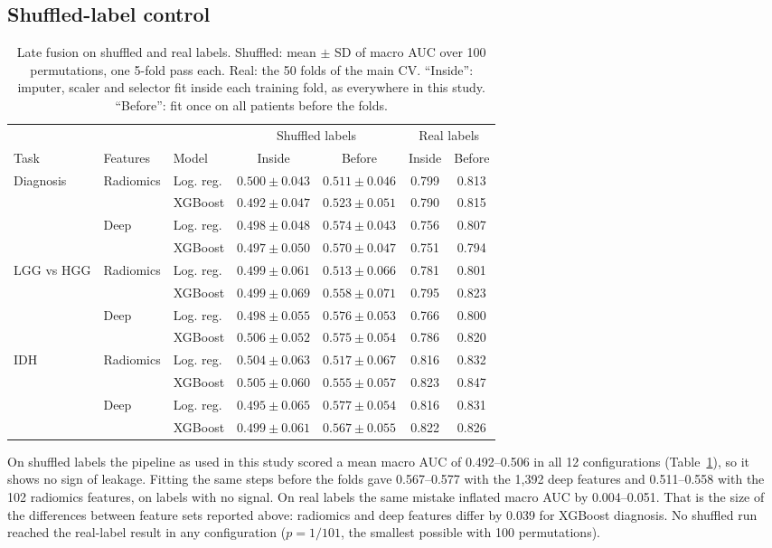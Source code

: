 \documentclass[11pt]{article}
\begin{document}
\subsection{Shuffled-label control}
\begin{table}[t]
\centering
\caption{Late fusion on shuffled and real labels. Shuffled: mean $\pm$ SD of macro AUC over 100 permutations, one 5-fold
pass each. Real: the 50 folds of the main CV. ``Inside'': imputer, scaler and selector fit inside each training fold,
as everywhere in this study. ``Before'': fit once on all patients before the folds.}
\label{tab:control}
\small
\begin{tabular}{lllcccc}
\toprule
 & & & \multicolumn{2}{c}{Shuffled labels} & \multicolumn{2}{c}{Real labels} \\
\cmidrule(lr){4-5}\cmidrule(lr){6-7}
Task & Features & Model & Inside & Before & Inside & Before \\
\midrule
Diagnosis & Radiomics & Log. reg. & $0.500 \pm 0.043$ & $0.511 \pm 0.046$ & 0.799 & 0.813 \\
 & & XGBoost & $0.492 \pm 0.047$ & $0.523 \pm 0.051$ & 0.790 & 0.815 \\
 & Deep & Log. reg. & $0.498 \pm 0.048$ & $0.574 \pm 0.043$ & 0.756 & 0.807 \\
 & & XGBoost & $0.497 \pm 0.050$ & $0.570 \pm 0.047$ & 0.751 & 0.794 \\
\midrule
LGG vs HGG & Radiomics & Log. reg. & $0.499 \pm 0.061$ & $0.513 \pm 0.066$ & 0.781 & 0.801 \\
 & & XGBoost & $0.499 \pm 0.069$ & $0.558 \pm 0.071$ & 0.795 & 0.823 \\
 & Deep & Log. reg. & $0.498 \pm 0.055$ & $0.576 \pm 0.053$ & 0.766 & 0.800 \\
 & & XGBoost & $0.506 \pm 0.052$ & $0.575 \pm 0.054$ & 0.786 & 0.820 \\
\midrule
IDH & Radiomics & Log. reg. & $0.504 \pm 0.063$ & $0.517 \pm 0.067$ & 0.816 & 0.832 \\
 & & XGBoost & $0.505 \pm 0.060$ & $0.555 \pm 0.057$ & 0.823 & 0.847 \\
 & Deep & Log. reg. & $0.495 \pm 0.065$ & $0.577 \pm 0.054$ & 0.816 & 0.831 \\
 & & XGBoost & $0.499 \pm 0.061$ & $0.567 \pm 0.055$ & 0.822 & 0.826 \\
\bottomrule
\end{tabular}
\end{table}

On shuffled labels the pipeline as used in this study scored a mean macro AUC of 0.492--0.506 in all 12 configurations
(Table~\ref{tab:control}), so it shows no sign of leakage. Fitting the same steps before the folds gave 0.567--0.577
with the 1,392 deep features and 0.511--0.558 with the 102 radiomics features, on labels with no signal. On real labels
the same mistake inflated macro AUC by 0.004--0.051. That is the size of the differences between feature sets reported
above: radiomics and deep features differ by 0.039 for XGBoost diagnosis. No shuffled run reached the real-label result
in any configuration ($p = 1/101$, the smallest possible with 100 permutations).
\end{document}
